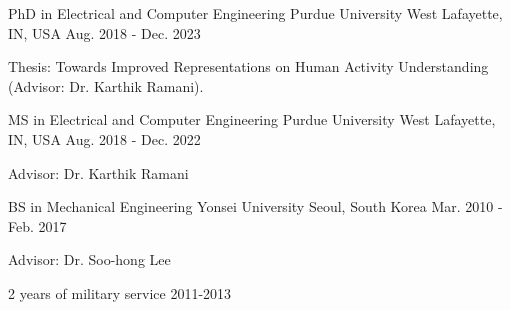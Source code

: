 


\begin{cventries}


    \cventry
    {PhD in Electrical and Computer Engineering} %
    {Purdue University} %
    {West Lafayette, IN, USA} %
    {Aug. 2018 - Dec. 2023} %
    { %
    \begin{cvitems}
        \item {Thesis: Towards Improved Representations on Human Activity Understanding (Advisor: Dr. Karthik Ramani).}
    \end{cvitems}
    }

    \cventry
    {MS in Electrical and Computer Engineering} %
    {Purdue University} %
    {West Lafayette, IN, USA} %
    {Aug. 2018 - Dec. 2022} %
    { %
    \begin{cvitems}
        \item {Advisor: Dr. Karthik Ramani}
    \end{cvitems}
    }

    \cventry
    {BS in Mechanical Engineering} %
    {Yonsei University} %
    {Seoul, South Korea} %
    {Mar. 2010 - Feb. 2017} %
    { %
    \begin{cvitems}
        \item {Advisor: Dr. Soo-hong Lee}
        \item {2 years of military service 2011-2013}
    \end{cvitems}
    }

\end{cventries}
